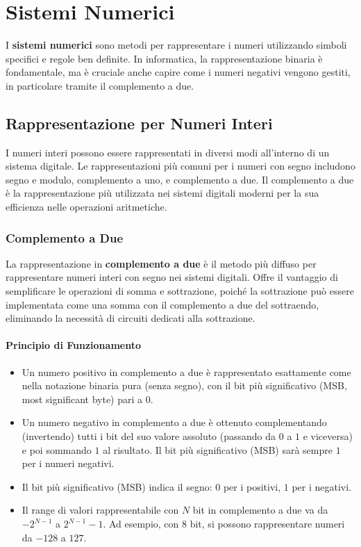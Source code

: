 \chapter{Sistemi Numerici}

I \textbf{sistemi numerici} sono metodi per rappresentare i numeri utilizzando simboli specifici e regole ben definite. In informatica, la rappresentazione binaria è fondamentale, ma è cruciale anche capire come i numeri negativi vengono gestiti, in particolare tramite il complemento a due.

\section{Rappresentazione per Numeri Interi}
I numeri interi possono essere rappresentati in diversi modi all'interno di un sistema digitale. Le rappresentazioni più comuni per i numeri con segno includono segno e modulo, complemento a uno, e complemento a due. Il complemento a due è la rappresentazione più utilizzata nei sistemi digitali moderni per la sua efficienza nelle operazioni aritmetiche.

\subsection{Complemento a Due}
La rappresentazione in \textbf{complemento a due} è il metodo più diffuso per rappresentare numeri interi con segno nei sistemi digitali. Offre il vantaggio di semplificare le operazioni di somma e sottrazione, poiché la sottrazione può essere implementata come una somma con il complemento a due del sottraendo, eliminando la necessità di circuiti dedicati alla sottrazione.

\subsubsection{Principio di Funzionamento}
\begin{itemize}
    \item Un numero positivo in complemento a due è rappresentato esattamente come nella notazione binaria pura (senza segno), con il bit più significativo (MSB, most significant byte) pari a $0$.
    \item Un numero negativo in complemento a due è ottenuto complementando (invertendo) tutti i bit del suo valore assoluto (passando da $0$ a $1$ e viceversa) e poi sommando $1$ al risultato. Il bit più significativo (MSB) sarà sempre $1$ per i numeri negativi.
    \item Il bit più significativo (MSB) indica il segno: $0$ per i positivi, $1$ per i negativi.
    \item Il range di valori rappresentabile con $N$ bit in complemento a due va da $-2^{N-1}$ a $2^{N-1}-1$. Ad esempio, con $8$ bit, si possono rappresentare numeri da $-128$ a $127$.
\end{itemize}

